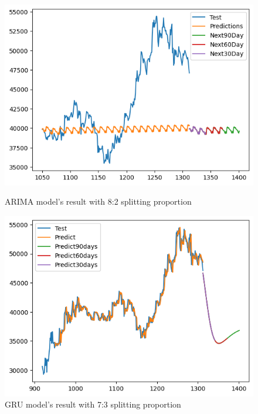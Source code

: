 \documentclass{ieeeojies}
\begin{document}
\begin{figure}[H]
    \centering
    \begin{minipage}{0.45\linewidth}
        \centering
        \includegraphics[width=\linewidth]{bibliography/diagram/ARIMA-BID.png}
        \caption{ARIMA model’s result with 8:2 splitting proportion}
        \label{fig:ARIMA-BID}
    \end{minipage}
    \hfill
    \begin{minipage}{0.45\linewidth}
        \centering
        \includegraphics[width=\linewidth]{bibliography/diagram/GRU-BID.png}
        \caption{GRU model’s result with 7:3 splitting proportion}
        \label{fig:GRU-BID}
    \end{minipage}
\end{figure}
\end{document}
